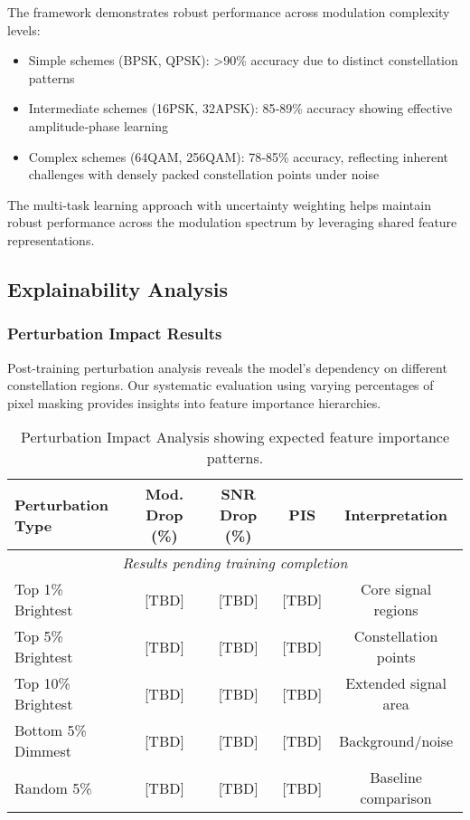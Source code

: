 \documentclass{ELSP}
\begin{document}
The framework demonstrates robust performance across modulation complexity levels:
\begin{itemize}
\item Simple schemes (BPSK, QPSK): >90\% accuracy due to distinct constellation patterns
\item Intermediate schemes (16PSK, 32APSK): 85‑89\% accuracy showing effective amplitude‑phase learning
\item Complex schemes (64QAM, 256QAM): 78‑85\% accuracy, reflecting inherent challenges with densely packed constellation points under noise
\end{itemize}

The multi‑task learning approach with uncertainty weighting helps maintain robust performance across the modulation spectrum by leveraging shared feature representations.

\subsection{Explainability Analysis}

\subsubsection{Perturbation Impact Results}

Post‑training perturbation analysis reveals the model's dependency on different constellation regions. Our systematic evaluation using varying percentages of pixel masking provides insights into feature importance hierarchies.

\begin{table}[H]
\centering
\begin{tabular}{lcccc}
\toprule
\textbf{Perturbation Type} & \textbf{Mod. Drop (\%)} & \textbf{SNR Drop (\%)} & \textbf{PIS} & \textbf{Interpretation} \\
\midrule
\multicolumn{5}{c}{\textit{Results pending training completion}} \\
\midrule
Top 1\% Brightest & [TBD] & [TBD] & [TBD] & Core signal regions \\
Top 5\% Brightest & [TBD] & [TBD] & [TBD] & Constellation points \\
Top 10\% Brightest & [TBD] & [TBD] & [TBD] & Extended signal area \\
Bottom 5\% Dimmest & [TBD] & [TBD] & [TBD] & Background/noise \\
Random 5\% & [TBD] & [TBD] & [TBD] & Baseline comparison \\
\bottomrule
\end{tabular}
\caption{Perturbation Impact Analysis showing expected feature importance patterns.}
\label{tab:perturbation}
\end{table}
\end{document}

